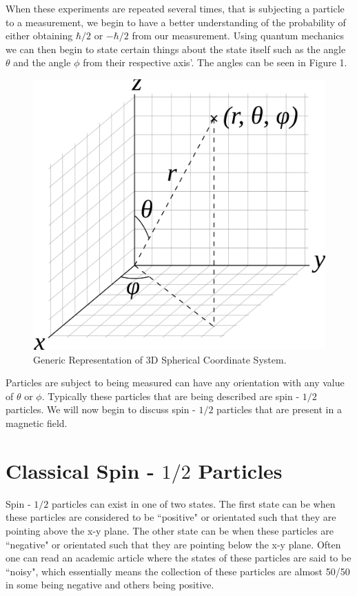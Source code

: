 \documentclass[twocolumn]{article}
\begin{document}
When these experiments are repeated several times, that is subjecting a particle to a measurement, we begin to have a better understanding of the probability of either obtaining $\hbar/2$ or $-\hbar/2$ from our measurement. Using quantum mechanics we can then begin to state certain things about the state itself such as the angle $\theta$ and the angle $\phi$ from their respective axis'. The angles can be seen in Figure 1.
\begin{figure}[htbp]
\begin{center}
\includegraphics[width=0.75\linewidth]{Spherical-Coordinate-System.png}
\caption{Generic Representation of 3D Spherical Coordinate System.}
\end{center}
\end{figure}
\newline
\newline
Particles are subject to being measured can have any orientation with any value of $\theta$ or $\phi$. Typically these particles that are being described are spin - $1/2$ particles. We will now begin to discuss spin - $1/2$ particles that are present in a magnetic field.
\section*{Classical Spin - $1/2$ Particles}
Spin - $1/2$ particles can exist in one of two states. The first state can be when these particles are considered to be ``positive" or orientated such that they are pointing above the x-y plane. The other state can be when these particles are ``negative" or orientated such that they are pointing below the x-y plane. Often one can read an academic article where the states of these particles are said to be ``noisy", which essentially means the collection of these particles are almost 50/50 in some being negative and others being positive.
\end{document}
